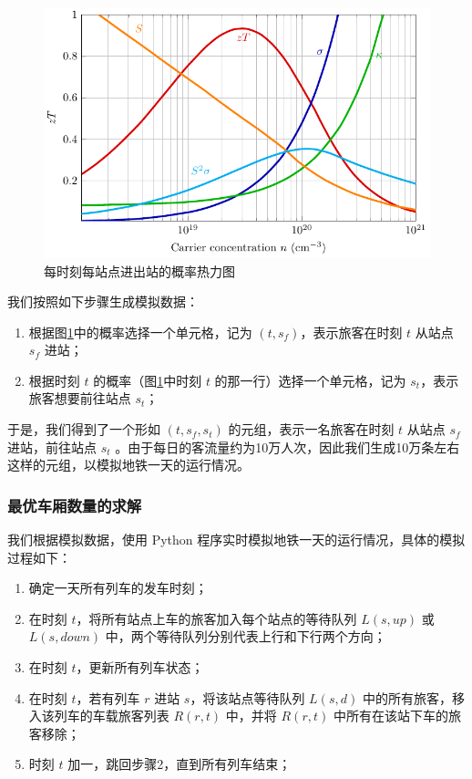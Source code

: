 \documentclass[12pt,a4paper]{mcmthesis}
\begin{document}
        \begin{figure}[h]
            \centerline{\includegraphics[scale=0.4]{figures/fig1}\quad}
            \caption{\song\wuhao 每时刻每站点进出站的概率热力图}
            \label{fig:p1_heatmap}
        \end{figure}

        我们按照如下步骤生成模拟数据：

        \begin{enumerate}
            \item 根据图\ref{fig:p1_heatmap}中的概率选择一个单元格，记为 $(t,s_f)$，表示旅客在时刻 $t$ 从站点 $s_f$ 进站；
            \item 根据时刻 $t$ 的概率（图\ref{fig:p1_heatmap}中时刻 $t$ 的那一行）选择一个单元格，记为 $s_t$，表示旅客想要前往站点 $s_t$；
        \end{enumerate}

        于是，我们得到了一个形如 $(t,s_f,s_t)$ 的元组，表示一名旅客在时刻 $t$ 从站点 $s_f$ 进站，前往站点 $s_t$ 。由于每日的客流量约为10万人次，因此我们生成10万条左右这样的元组，以模拟地铁一天的运行情况。

    \subsubsection{最优车厢数量的求解}

        我们根据模拟数据，使用 Python 程序实时模拟地铁一天的运行情况，具体的模拟过程如下：

        \begin{enumerate}
            \item 确定一天所有列车的发车时刻；
            \item 在时刻 $t$，将所有站点上车的旅客加入每个站点的等待队列 $L(s,up)$ 或 $L(s,down)$ 中，两个等待队列分别代表上行和下行两个方向；
            \item 在时刻 $t$，更新所有列车状态；
            \item 在时刻 $t$，若有列车 $r$ 进站 $s$，将该站点等待队列 $L(s,d)$ 中的所有旅客，移入该列车的车载旅客列表 $R(r,t)$ 中，并将 $R(r,t)$ 中所有在该站下车的旅客移除；
            \item 时刻 $t$ 加一，跳回步骤2，直到所有列车结束；
        \end{enumerate}
\end{document}
